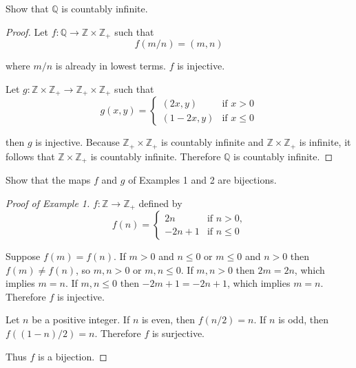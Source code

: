 \begin{exercise}\label{chapter1:section7:exercise1}
    Show that $\mathbb{Q}$ is countably infinite.
\end{exercise}

\begin{proof}
    Let $f: \mathbb{Q}\to \mathbb{Z}\times\mathbb{Z}_{+}$ such that
    \[
        f(m/n) = (m, n)
    \]

    where $m/n$ is already in lowest terms. $f$ is injective.

    Let $g: \mathbb{Z}\times\mathbb{Z}_{+}\to \mathbb{Z}_{+}\times\mathbb{Z}_{+}$ such that
    \[
        g(x, y) = \begin{cases}
            (2x, y)     & \text{if $x > 0$}   \\
            (1 - 2x, y) & \text{if $x\leq 0$}
        \end{cases}
    \]

    then $g$ is injective. Because $\mathbb{Z}_{+}\times\mathbb{Z}_{+}$ is countably infinite and $\mathbb{Z}\times\mathbb{Z}_{+}$ is infinite, it follows that $\mathbb{Z}\times\mathbb{Z}_{+}$ is countably infinite. Therefore $\mathbb{Q}$ is countably infinite.
\end{proof}

\begin{exercise}\label{chapter1:section7:exercise2}
    Show that the maps $f$ and $g$ of Examples 1 and 2 are bijections.
\end{exercise}

\begin{proof}[Proof of Example 1]
    $f: \mathbb{Z}\to \mathbb{Z}_{+}$ defined by
    \[
        f(n) = \begin{cases}
            2n      & \text{if $n > 0$,}  \\
            -2n + 1 & \text{if $n\leq 0$}
        \end{cases}
    \]

    Suppose $f(m) = f(n)$. If $m > 0$ and $n\leq 0$ or $m\leq 0$ and $n > 0$ then $f(m)\ne f(n)$, so $m, n > 0$ or $m, n\leq 0$. If $m, n > 0$ then $2m = 2n$, which implies $m = n$. If $m, n\leq 0$ then $-2m + 1 = -2n + 1$, which implies $m = n$. Therefore $f$ is injective.

    Let $n$ be a positive integer. If $n$ is even, then $f(n/2) = n$. If $n$ is odd, then $f((1 - n)/2) = n$. Therefore $f$ is surjective.

    Thus $f$ is a bijection.
\end{proof}

